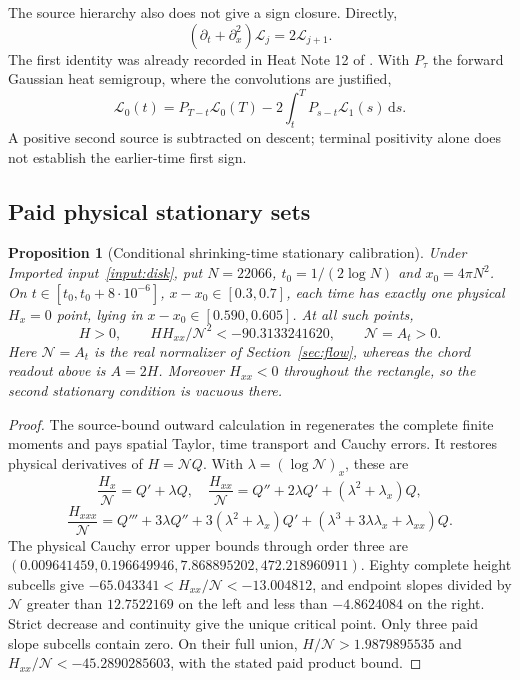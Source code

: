 \documentclass[11pt]{article}
\newtheorem{proposition}[theorem]{Proposition}
\theoremstyle{definition}
\theoremstyle{remark}
\newcommand{\dd}{\,\mathrm d}
\begin{document}
The source hierarchy also does not give a sign closure. Directly,
\begin{equation}
 (\partial_t+\partial_x^2)\mathscr L_j=2\mathscr L_{j+1}.
 \label{eq:laguerre-hierarchy}
\end{equation}
The first identity was already recorded in Heat Note 12 of
\cite{heatnotes}. With $P_\tau$ the forward Gaussian heat semigroup,
where the convolutions are justified,
\[
 \mathscr L_0(t)=P_{T-t}\mathscr L_0(T)
 -2\int_t^T P_{s-t}\mathscr L_1(s)\dd s.
\]
A positive second source is subtracted on descent; terminal positivity
alone does not establish the earlier-time first sign.

\subsection{Paid physical stationary sets}

\begin{proposition}[Conditional shrinking-time stationary calibration]
\label{prop:high-theta-sign}
Under Imported input~\ref{input:disk}, put
$N=22066$, $t_0=1/(2\log N)$ and $x_0=4\pi N^2$.
On $t\in[t_0,t_0+8\cdot10^{-6}]$,
$x-x_0\in[0.3,0.7]$, each time has exactly one physical $H_x=0$
point, lying in $x-x_0\in[0.590,0.605]$. At all such points,
\[
 H>0,
 \qquad HH_{xx}/\mathcal N^2<-90.3133241620,
 \qquad \mathcal N=A_t>0.
\]
Here $\mathcal N=A_t$ is the real normalizer of Section~\ref{sec:flow},
whereas the chord readout above is $A=2H$. Moreover $H_{xx}<0$ throughout
the rectangle, so the second stationary condition is vacuous there.
\end{proposition}
\begin{proof}
The source-bound outward calculation in \cite{thetacontinuation}
regenerates the complete finite moments and pays spatial Taylor,
time transport and Cauchy errors. It restores physical derivatives of
$H=\mathcal N Q$. With $\lambda=(\log\mathcal N)_x$, these are
\[
 \frac{H_x}{\mathcal N}=Q'+\lambda Q,\quad
 \frac{H_{xx}}{\mathcal N}=Q''+2\lambda Q'+(\lambda^2+\lambda_x)Q,
\]
\[
 \frac{H_{xxx}}{\mathcal N}=Q'''+3\lambda Q''
 +3(\lambda^2+\lambda_x)Q'
 +(\lambda^3+3\lambda\lambda_x+\lambda_{xx})Q.
\]
The physical Cauchy error upper bounds through order three are
$(0.009641459,0.196649946,7.868895202,472.218960911)$.
Eighty complete height subcells give
$-65.043341<H_{xx}/\mathcal N<-13.004812$,
and endpoint slopes divided by $\mathcal N$ greater than $12.7522169$
on the left and less than $-4.8624084$ on the right. Strict decrease
and continuity give the unique critical point. Only three paid slope
subcells contain zero. On their full union,
$H/\mathcal N>1.9879895535$ and
$H_{xx}/\mathcal N<-45.2890285603$, with the stated paid product bound.
\end{proof}
\end{document}
